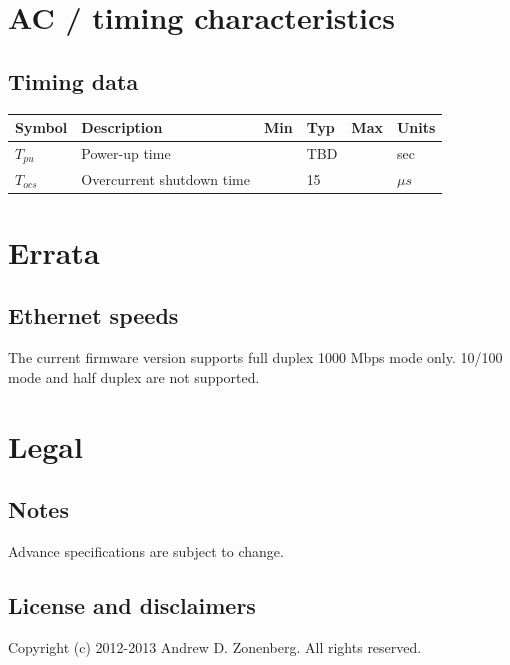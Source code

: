 \documentclass{article}
\begin{document}
\section{AC / timing characteristics}

\subsection{Timing data}

\begin{longtable}{|l|p{2in}|p{0.5in}|p{0.65in}|p{0.65in}|p{0.5in}|}
\hline
{\bf Symbol} & {\bf Description} & {\bf Min} & {\bf Typ} & {\bf Max} & {\bf Units}\\
\hline
$T_{pu}$ & Power-up time & & TBD & & sec\\
\hline
$T_{ocs}$ & Overcurrent shutdown time & & 15 & & $\mu s$\\
\hline
\end{longtable}

\pagebreak
\section{Errata}

\subsection{Ethernet speeds}

The current firmware version supports full duplex 1000 Mbps mode only. 10/100 mode and half duplex are not 
supported.

\pagebreak
\section{Legal}

\subsection{Notes}

Advance specifications are subject to change.

\subsection{License and disclaimers}
                                                                                                                   
Copyright (c) 2012-2013 Andrew D. Zonenberg. All rights reserved.
\end{document}
